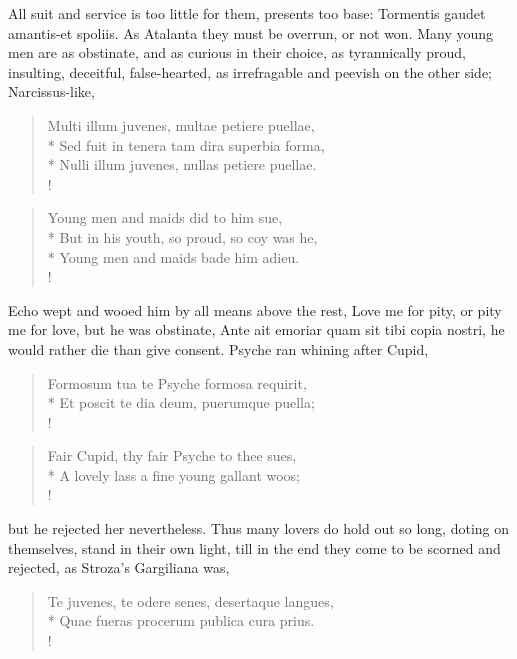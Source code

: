 All suit and service is too little for them, presents too base:
Tormentis gaudet amantis-et spoliis. As Atalanta they must be overrun,
or not won. Many young men are as obstinate, and as curious in their
choice, as tyrannically proud, insulting, deceitful, false-hearted, as
irrefragable and peevish on the other side; Narcissus-like,
%
\begin{latin}%
\begin{verse}%
Multi illum juvenes, multae petiere puellae,\\*
Sed fuit in tenera tam dira superbia forma,\\*
Nulli illum juvenes, nullas petiere puellae.\\!
\end{verse}%
\end{latin}%
\translationrule%
\begin{verse}%
Young men and maids did to him sue,\\*
But in his youth, so proud, so coy was he,\\*
Young men and maids bade him adieu.\\!
\end{verse}%
%

Echo wept and wooed him by all means above the rest, Love me for pity,
or pity me for love, but he was obstinate, Ante ait emoriar quam sit
tibi copia nostri, he would rather die than give consent. Psyche ran
whining after Cupid,
%
\begin{latin}%
\begin{verse}%
Formosum tua te Psyche formosa requirit,\\*
Et poscit te dia deum, puerumque puella;\\!
\end{verse}%
\end{latin}%
\translationrule%
\begin{verse}%
Fair Cupid, thy fair Psyche to thee sues,\\*
A lovely lass a fine young gallant woos;\\!
\end{verse}%
%

but he rejected her nevertheless. Thus many lovers do hold out so long,
doting on themselves, stand in their own light, till in the end they
come to be scorned and rejected, as Stroza's Gargiliana was,

\begin{latin}%
\begin{verse}%
Te juvenes, te odere senes, desertaque langues,\\*
Quae fueras procerum publica cura prius.\\!
\end{verse}%
\end{latin}%


